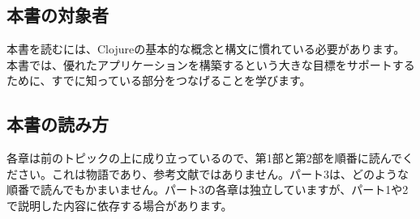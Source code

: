 \subsection{本書の対象者}

本書を読むには、Clojureの基本的な概念と構文に慣れている必要があります。本書では、優れたアプリケーションを構築するという大きな目標をサポートするために、すでに知っている部分をつなげることを学びます。

\subsection{本書の読み方}

各章は前のトピックの上に成り立っているので、第1部と第2部を順番に読んでください。これは物語であり、参考文献ではありません。パート3は、どのような順番で読んでもかまいません。パート3の各章は独立していますが、パート1や2で説明した内容に依存する場合があります。




